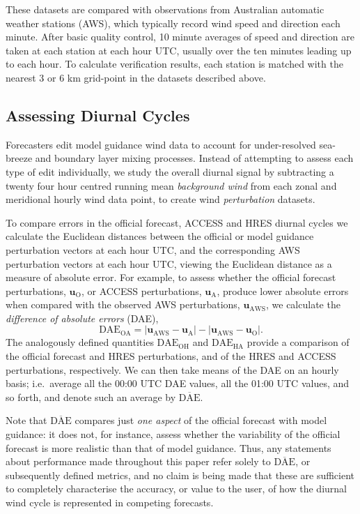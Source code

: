 \documentclass{ametsoc}
\begin{document}
These datasets are compared with observations from Australian automatic weather stations (AWS), which typically record wind speed and direction each minute. After basic quality control, 10 minute averages of speed and direction are taken at each station at each hour UTC, usually over the ten minutes leading up to each hour. To calculate verification results, each station is matched with the nearest 3 or 6 km grid-point in the datasets described above.

\subsection{Assessing Diurnal Cycles}
Forecasters edit model guidance wind data to account for under-resolved sea-breeze and boundary layer mixing processes. Instead of attempting to assess each type of edit individually, we study the overall diurnal signal by subtracting a twenty four hour centred running mean \textit{background wind} from each zonal and meridional hourly wind data point, to create wind \emph{perturbation} datasets. 

To compare errors in the official forecast, ACCESS and HRES diurnal cycles we calculate the Euclidean distances between the official or model guidance perturbation vectors at each hour UTC, and the corresponding AWS perturbation vectors at each hour UTC, viewing the Euclidean distance as a measure of absolute error. For example, to assess whether the official forecast perturbations, $\boldsymbol{u}_{\text{O}}$, or ACCESS perturbations, $\boldsymbol{u}_{\text{A}}$, produce lower absolute errors when compared with the observed AWS perturbations, $\boldsymbol{u}_{\text{AWS}}$, we calculate the \textit{difference of absolute errors} (DAE), 
\begin{equation}
\text{DAE}_\text{OA} = \left\lvert \boldsymbol{u}_{\text{AWS}}-\boldsymbol{u}_{\text{A}} \right\rvert - \left\lvert \boldsymbol{u}_{\text{AWS}}-\boldsymbol{u}_{\text{O}} \right\rvert. \label{Eq:DAE}
\end{equation} 
The analogously defined quantities $\text{DAE}_\text{OH}$ and $\text{DAE}_\text{HA}$ provide a comparison of the official forecast and HRES perturbations, and of the HRES and ACCESS perturbations, respectively. We can then take means of the DAE on an hourly basis; i.e.~average all the 00:00 UTC DAE values,  all the 01:00 UTC values, and so forth, and denote such an average by $\overline{\text{DAE}}$. 

Note that $\overline{\text{DAE}}$ compares just \textit{one aspect} of the official forecast with model guidance: it does not, for instance, assess whether the variability of the official forecast is more realistic than that of model guidance. Thus, any statements about performance made throughout this paper refer solely to $\overline{\text{DAE}}$, or subsequently defined metrics, and no claim is being made that these are sufficient to completely characterise the accuracy, or value to the user, of how the diurnal wind cycle is represented in competing forecasts.
\end{document}
